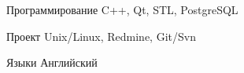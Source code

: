 

\begin{cvskills}

  \cvskill
    {Программирование} %
    {C++, Qt, STL, PostgreSQL} %

  \cvskill
    {\faCodeFork\acvHeaderIconSep\acvHeaderIconSep Проект} %
    {Unix/Linux, Redmine, Git/Svn } %

  \cvskill
    {\faLanguage\acvHeaderIconSep\acvHeaderIconSep Языки} %
    {Английский} %

\end{cvskills}
